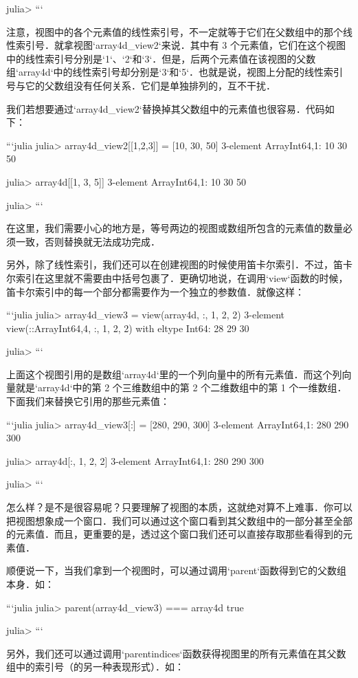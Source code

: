 julia> 
```

注意，视图中的各个元素值的线性索引号，不一定就等于它们在父数组中的那个线性索引号．就拿视图`array4d_view2`来说．其中有 3 个元素值，它们在这个视图中的线性索引号分别是`1`、`2`和`3`．但是，后两个元素值在该视图的父数组`array4d`中的线性索引号却分别是`3`和`5`．也就是说，视图上分配的线性索引号与它的父数组没有任何关系．它们是单独排列的，互不干扰．

我们若想要通过`array4d_view2`替换掉其父数组中的元素值也很容易．代码如下：

```julia
julia> array4d_view2[[1,2,3]] = [10, 30, 50]
3-element Array{Int64,1}:
 10
 30
 50

julia> array4d[[1, 3, 5]]
3-element Array{Int64,1}:
 10
 30
 50

julia> 
```

在这里，我们需要小心的地方是，等号两边的视图或数组所包含的元素值的数量必须一致，否则替换就无法成功完成．

另外，除了线性索引，我们还可以在创建视图的时候使用笛卡尔索引．不过，笛卡尔索引在这里就不需要由中括号包裹了．更确切地说，在调用`view`函数的时候，笛卡尔索引中的每一个部分都需要作为一个独立的参数值．就像这样：

```julia
julia> array4d_view3 = view(array4d, :, 1, 2, 2)
3-element view(::Array{Int64,4}, :, 1, 2, 2) with eltype Int64:
 28
 29
 30

julia>  
```

上面这个视图引用的是数组`array4d`里的一个列向量中的所有元素值．而这个列向量就是`array4d`中的第 2 个三维数组中的第 2 个二维数组中的第 1 个一维数组．下面我们来替换它引用的那些元素值：

```julia
julia> array4d_view3[:] = [280, 290, 300]
3-element Array{Int64,1}:
 280
 290
 300

julia> array4d[:, 1, 2, 2]
3-element Array{Int64,1}:
 280
 290
 300

julia> 
```

怎么样？是不是很容易呢？只要理解了视图的本质，这就绝对算不上难事．你可以把视图想象成一个窗口．我们可以通过这个窗口看到其父数组中的一部分甚至全部的元素值．而且，更重要的是，透过这个窗口我们还可以直接存取那些看得到的元素值．

顺便说一下，当我们拿到一个视图时，可以通过调用`parent`函数得到它的父数组本身．如：

```julia
julia> parent(array4d_view3) === array4d
true

julia> 
```

另外，我们还可以通过调用`parentindices`函数获得视图里的所有元素值在其父数组中的索引号（的另一种表现形式）．如：

